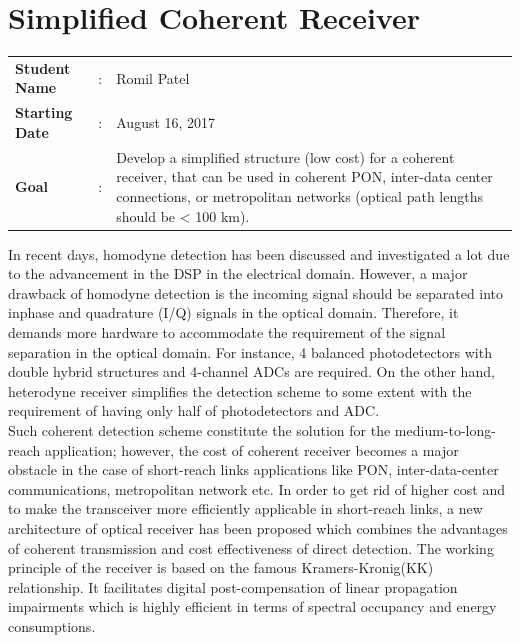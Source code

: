 \clearpage

\section{Simplified Coherent Receiver}

\begin{tcolorbox}	
\begin{tabular}{p{2.75cm} p{0.2cm} p{10.5cm}} 	
\textbf{Student Name}  &:& Romil Patel\\
\textbf{Starting Date} &:& August 16, 2017\\ 
\textbf{Goal}          &:& Develop a simplified structure (low cost) for a coherent receiver, that can be used in coherent PON, inter-data center connections, or metropolitan networks (optical path lengths should be < 100 km). 
\end{tabular}
\end{tcolorbox}

In recent days, homodyne detection has been discussed and investigated a lot due to the advancement in the DSP in the electrical domain. However, a major drawback of homodyne detection is the incoming signal should be separated into inphase and quadrature (I/Q) signals in the optical domain. Therefore, it demands more hardware to accommodate the requirement of the signal separation  in the optical domain. For instance, 4 balanced photodetectors with double hybrid structures and 4-channel ADCs are required.
On the other hand, heterodyne receiver simplifies the detection scheme to some extent with the requirement of having only half of photodetectors and ADC.\\
Such coherent detection scheme constitute the solution for the medium-to-long-reach application; however, the cost of coherent receiver becomes a major obstacle in the case of short-reach links applications like PON, inter-data-center communications, metropolitan network etc. In order to get rid of higher cost and to make the transceiver more efficiently applicable in short-reach links, a new architecture of optical receiver has been proposed which combines the advantages of coherent transmission and cost effectiveness of direct detection. The working principle of the receiver is based on the famous Kramers-Kronig(KK) relationship. It facilitates digital post-compensation of linear propagation impairments which is highly efficient in terms of spectral occupancy and energy consumptions.

